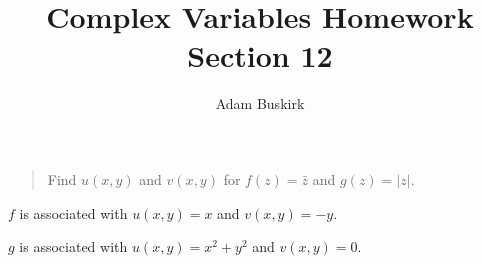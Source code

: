 \documentclass{article}
\title{Complex Variables Homework Section 12}
\author{Adam Buskirk}
\theoremstyle{definition}
\begin{document}
\maketitle

\begin{quote}
Find $u(x,y)$ and $v(x,y)$ for $f(z)=\bar{z}$ and $g(z)=|z|$.
\end{quote}

$f$ is associated with $u(x,y)=x$ and $v(x,y)=-y$.

$g$ is associated with $u(x,y)=x^2 + y^2$ and $v(x,y)=0$.
\end{document}
